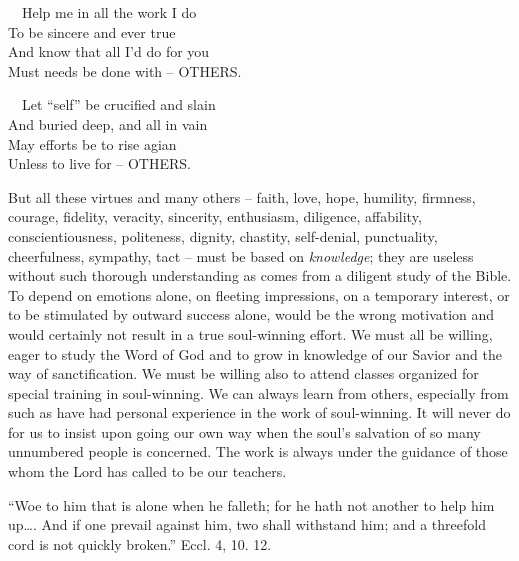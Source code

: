 \documentclass[
]{book}
\begin{document}
~~Help me in all the work I do\\
\hspace*{0.333em}\hspace*{0.333em}To be sincere and ever true\\
\hspace*{0.333em}\hspace*{0.333em}And know that all I'd do for you\\
\hspace*{0.333em}\hspace*{0.333em}Must needs be done with -- OTHERS.

~~Let ``self'' be crucified and slain\\
\hspace*{0.333em}\hspace*{0.333em}And buried deep, and all in vain\\
\hspace*{0.333em}\hspace*{0.333em}May efforts be to rise agian\\
\hspace*{0.333em}\hspace*{0.333em}Unless to live for -- OTHERS.

But all these virtues and many others -- faith, love, hope, humility, firmness, courage, fidelity, veracity, sincerity, enthusiasm, diligence, affability, conscientiousness, politeness, dignity, chastity, self-denial, punctuality, cheerfulness, sympathy, tact -- must be based on \emph{knowledge}; they are useless without such thorough understanding as comes from a diligent study of the Bible. To depend on emotions alone, on fleeting impressions, on a temporary interest, or to be stimulated by outward success alone, would be the wrong motivation and would certainly not result in a true soul-winning effort. We must all be willing, eager to study the Word of God and to grow in knowledge of our Savior and the way of sanctification. We must be willing also to attend classes organized for special training in soul-winning. We can always learn from others, especially from such as have had personal experience in the work of soul-winning. It will never do for us to insist upon going our own way when the soul's salvation of so many unnumbered people is concerned. The work is always under the guidance of those whom the Lord has called to be our teachers.

``Woe to him that is alone when he falleth; for he hath not another to help him up\ldots. And if one prevail against him, two shall withstand him; and a threefold cord is not quickly broken.'' Eccl. 4, 10. 12.
\end{document}
